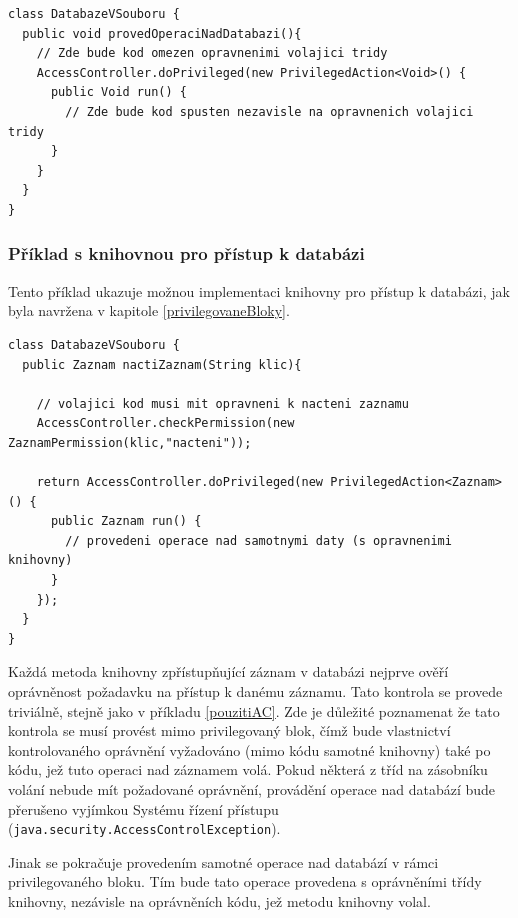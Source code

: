 \begin{lstlisting}[caption=Příklad použití privilegovaného bloku, label=prikladBloku]
class DatabazeVSouboru {
  public void provedOperaciNadDatabazi(){
    // Zde bude kod omezen opravnenimi volajici tridy
    AccessController.doPrivileged(new PrivilegedAction<Void>() {
      public Void run() {
        // Zde bude kod spusten nezavisle na opravnenich volajici tridy
      }
    }
  }
}
\end{lstlisting}

\subsubsection{Příklad s knihovnou pro přístup k databázi}\label{databazeVsouboru}

Tento příklad ukazuje možnou implementaci knihovny pro přístup k databázi, jak byla navržena v kapitole \ref{privilegovaneBloky}.

\begin{lstlisting}[caption=Demonstrační knihovna pro přístup k databázi, label=pouzitiAC]
class DatabazeVSouboru {
  public Zaznam nactiZaznam(String klic){
    
    // volajici kod musi mit opravneni k nacteni zaznamu
    AccessController.checkPermission(new ZaznamPermission(klic,"nacteni"));
    
    return AccessController.doPrivileged(new PrivilegedAction<Zaznam>() {
      public Zaznam run() {
        // provedeni operace nad samotnymi daty (s opravnenimi knihovny)
      }
    });
  }
}
\end{lstlisting}

Každá metoda knihovny zpřístupňující záznam v databázi nejprve ověří oprávněnost požadavku na přístup k danému záznamu. Tato kontrola se provede triviálně, stejně jako v příkladu \ref{pouzitiAC}. Zde je důležité poznamenat že tato kontrola se musí provést mimo privilegovaný blok, čímž bude vlastnictví kontrolovaného oprávnění vyžadováno (mimo kódu samotné knihovny) také po kódu, jež tuto operaci nad záznamem volá. Pokud některá z tříd na zásobníku volání nebude mít požadované oprávnění, provádění operace nad databází bude přerušeno vyjímkou Systému řízení přístupu ({\tt java.security.AccessControlException}).

Jinak se pokračuje provedením samotné operace nad databází v rámci privilegovaného bloku. Tím bude tato operace provedena s oprávněními třídy knihovny, nezávisle na oprávněních kódu, jež metodu knihovny volal.

